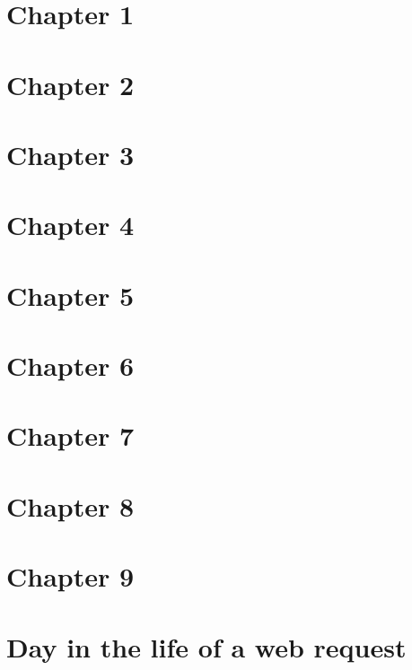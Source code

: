 \documentclass[12pt, a4paper]{article}
\begin{document}
\begin{multicols*}{2}
	\section{Chapter 1}
	
	
	\section{Chapter 2}
	
	
	
	\section{Chapter 3}
	
	
	
	\section{Chapter 4}
	
	
	\section{Chapter 5}
	
	
	\section{Chapter 6}
	
	
	\section{Chapter 7}
	
	
	\section{Chapter 8}
	
	
	\section{Chapter 9}
	
	
	\section{Day in the life of a web request}

\end{multicols*}
\end{document}
